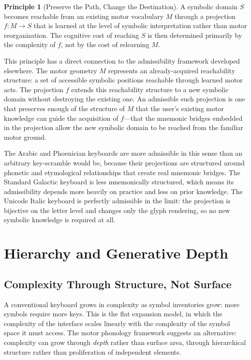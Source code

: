 \documentclass[12pt,a4paper]{article}
\theoremstyle{plain}
\theoremstyle{definition}
\newtheorem{principle}{Principle}
\theoremstyle{remark}
\begin{document}
\begin{principle}[Preserve the Path, Change the Destination]
A symbolic domain $S$ becomes reachable from an existing motor vocabulary $M$
through a projection $f : M \to S$ that is learned at the level of symbolic
interpretation rather than motor reorganization. The cognitive cost of
reaching $S$ is then determined primarily by the complexity of $f$, not
by the cost of relearning $M$.
\end{principle}

This principle has a direct connection to the admissibility framework developed
elsewhere. The motor geometry $M$ represents an already-acquired reachability
structure: a set of accessible symbolic positions reachable through learned
motor acts. The projection $f$ extends this reachability structure to a new
symbolic domain without destroying the existing one. An admissible such
projection is one that preserves enough of the structure of $M$ that the user's
existing motor knowledge can guide the acquisition of $f$---that the mnemonic
bridges embedded in the projection allow the new symbolic domain to be reached
from the familiar motor ground.

The Arabic and Phoenician keyboards are more admissible in this sense than an
arbitrary key-scramble would be, because their projections are structured around
phonetic and etymological relationships that create real mnemonic bridges.
The Standard Galactic keyboard is less mnemonically structured, which means its
admissibility depends more heavily on practice and less on prior knowledge.
The Unicode Italic keyboard is perfectly admissible in the limit: the projection
is bijective on the letter level and changes only the glyph rendering, so no
new symbolic knowledge is required at all.

\section{Hierarchy and Generative Depth}

\subsection{Complexity Through Structure, Not Surface}

A conventional keyboard grows in complexity as symbol inventories grow: more
symbols require more keys. This is the flat expansion model, in which the
complexity of the interface scales linearly with the complexity of the symbol
space it must access. The motor phonology framework suggests an alternative:
complexity can grow through \emph{depth} rather than surface area, through
hierarchical structure rather than proliferation of independent elements.
\end{document}
